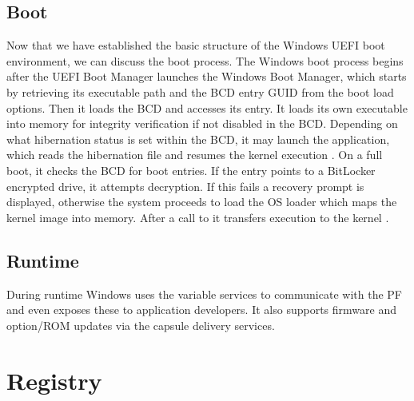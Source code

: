 \subsection{Boot}

Now that we have established the basic structure of the Windows \ac{UEFI} boot environment, we can discuss the boot process.
The Windows boot process begins after the \ac{UEFI} Boot Manager launches the Windows Boot Manager, which starts by retrieving its executable path and the \ac{BCD} entry \ac{GUID} from the boot load options.
Then it loads the \ac{BCD} and accesses its entry.
It loads its own executable into memory for integrity verification \cite[Section 12]{windows-internals-7-part2} if not disabled in the \ac{BCD}.
Depending on what hibernation status is set within the \ac{BCD}, it may launch the  application, which reads the hibernation file and resumes the kernel execution \cite[Section 12]{windows-internals-7-part2}.
On a full boot, it checks the \ac{BCD} for boot entries.
If the entry points to a BitLocker encrypted drive, it attempts decryption.
If this fails a recovery prompt is displayed, otherwise the system proceeds to load the \ac{OS} loader  which maps the kernel image  into memory. After a call to  it transfers execution to the kernel \cite[Section 12]{windows-internals-7-part2}.

\subsection{Runtime}

During runtime Windows uses the variable services to communicate with the \ac{PF} and even exposes these to application developers.
It also supports firmware and option\-/\ac{ROM} updates via the capsule delivery services.

\section{Registry}

